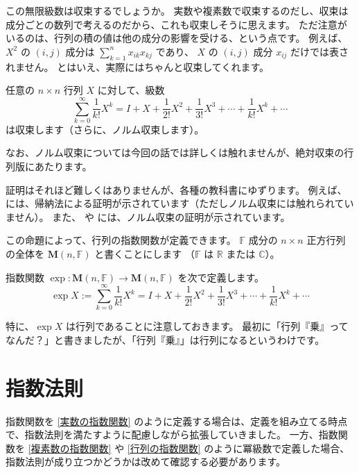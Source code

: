 \documentclass[a5paper]{ltjsarticle}
\begin{document}
この無限級数は収束するでしょうか。
実数や複素数で収束するのだし、収束は成分ごとの数列で考えるのだから、これも収束しそうに思えます。
ただ注意がいるのは、行列の積の値は他の成分の影響を受ける、という点です。
例えば、\(X^2\) の \((i,j)\) 成分は \( \sum_{k=1}^{n} x_{ik} x_{kj} \) であり、
\(X\) の \((i,j)\) 成分 \(x_{ij}\) だけでは表されません。
とはいえ、実際にはちゃんと収束してくれます。

\begin{usmproposition}
    任意の \(n \times n\) 行列 \(X\) に対して、級数
    \[
        \sum_{k=0}^{\infty} \frac{1}{k!} X^k
        = I + X + \frac{1}{2!}X^2 + \frac{1}{3!}X^3 + \cdots + \frac{1}{k!}X^k + \cdots
    \]
    は収束します（さらに、ノルム収束します）。
\end{usmproposition}

なお、ノルム収束については今回の話では詳しくは触れませんが、絶対収束の行列版にあたります。

証明はそれほど難しくはありませんが、各種の教科書にゆずります。
例えば、\cite{Satake} には、帰納法による証明が示されています（ただしノルム収束には触れられていません）。
また、\cite{Saito} や \cite{Inoguchi} には、ノルム収束の証明が示されています。

この命題によって、行列の指数関数が定義できます。
\(\mathbb{F}\) 成分の \(n \times n\) 正方行列の全体を \(\mathbf{M}(n,\mathbb{F})\) と書くことにします
（\(\mathbb{F}\) は \(\mathbb{R}\) または \(\mathbb{C}\)）。

\begin{usmdefinition}[行列の指数関数]\label{行列の指数関数}
    指数関数 \(\exp : \mathbf{M}(n,\mathbb{F}) \to \mathbf{M}(n,\mathbb{F})\) を次で定義します。
    \[
        \exp X := \sum_{k=0}^{\infty} \frac{1}{k!} X^k
        = I + X + \frac{1}{2!}X^2 + \frac{1}{3!}X^3 + \cdots + \frac{1}{k!}X^k + \cdots
    \]
\end{usmdefinition}

特に、\(\exp X\) は行列であることに注意しておきます。
最初に「行列『乗』ってなんだ？」と書きましたが、「行列『乗』」は行列になるというわけです。

\section{指数法則}

指数関数を \autoref{実数の指数関数} のように定義する場合は、定義を組み立てる時点で、指数法則を満たすように配慮しながら拡張していきました。
一方、指数関数を \autoref{複素数の指数関数} や \autoref{行列の指数関数} のように冪級数で定義した場合、
指数法則が成り立つかどうかは改めて確認する必要があります。
\end{document}
